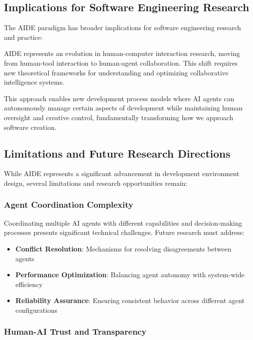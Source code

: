 \subsection{Implications for Software Engineering Research}

The AIDE paradigm has broader implications for software engineering research and practice:

\begin{infobox}[title=Research Impact]
AIDE represents an evolution in human-computer interaction research, moving from human-tool interaction to human-agent collaboration. This shift requires new theoretical frameworks for understanding and optimizing collaborative intelligence systems.
\end{infobox}

This approach enables new development process models where AI agents can autonomously manage certain aspects of development while maintaining human oversight and creative control, fundamentally transforming how we approach software creation.

\subsection{Limitations and Future Research Directions}

While AIDE represents a significant advancement in development environment design, several limitations and research opportunities remain:

\subsubsection{Agent Coordination Complexity}

Coordinating multiple AI agents with different capabilities and decision-making processes presents significant technical challenges. Future research must address:

\begin{itemize}
    \item \textbf{Conflict Resolution}: Mechanisms for resolving disagreements between agents
    \item \textbf{Performance Optimization}: Balancing agent autonomy with system-wide efficiency
    \item \textbf{Reliability Assurance}: Ensuring consistent behavior across different agent configurations
\end{itemize}

\subsubsection{Human-AI Trust and Transparency}

